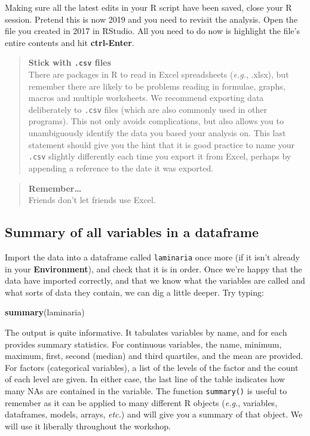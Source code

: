 \documentclass[
]{book}
\newenvironment{Shaded}{\begin{snugshade}}{\end{snugshade}}
\newcommand{\KeywordTok}[1]{\textcolor[rgb]{0.13,0.29,0.53}{\textbf{#1}}}
\newcommand{\NormalTok}[1]{#1}
\begin{document}
Making sure all the latest edits in your R script have been saved, close your R session. Pretend this is now 2019 and you need to revisit the analysis. Open the file you created in 2017 in RStudio. All you need to do now is highlight the file's entire contents and hit \textbf{ctrl-Enter}.

\begin{quote}
\textbf{Stick with \texttt{.csv} files}\\
There are packages in R to read in Excel spreadsheets (\emph{e.g.}, .xlsx), but remember there are likely to be problems reading in formulae, graphs, macros and multiple worksheets. We recommend exporting data deliberately to \texttt{.csv} files (which are also commonly used in other programs). This not only avoids complications, but also allows you to unambiguously identify the data you based your analysis on. This last statement should give you the hint that it is good practice to name your \texttt{.csv} slightly differently each time you export it from Excel, perhaps by appending a reference to the date it was exported.
\end{quote}

\begin{quote}
\textbf{Remember\ldots{}}\\
Friends don't let friends use Excel.
\end{quote}

\hypertarget{summary-of-all-variables-in-a-dataframe}{%
\subsection{Summary of all variables in a dataframe}\label{summary-of-all-variables-in-a-dataframe}}

Import the data into a dataframe called \texttt{laminaria} once more (if it isn't already in your \textbf{Environment}), and check that it is in order. Once we're happy that the data have imported correctly, and that we know what the variables are called and what sorts of data they contain, we can dig a little deeper. Try typing:

\begin{Shaded}
\begin{Highlighting}[]
\KeywordTok{summary}\NormalTok{(laminaria)}
\end{Highlighting}
\end{Shaded}

The output is quite informative. It tabulates variables by name, and for each provides summary statistics. For continuous variables, the name, minimum, maximum, first, second (median) and third quartiles, and the mean are provided. For factors (categorical variables), a list of the levels of the factor and the count of each level are given. In either case, the last line of the table indicates how many NAs are contained in the variable. The function \texttt{summary()} is useful to remember as it can be applied to many different R objects (\emph{e.g.}, variables, dataframes, models, arrays, \emph{etc.}) and will give you a summary of that object. We will use it liberally throughout the workshop.
\end{document}
